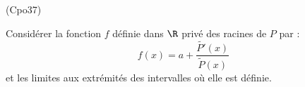 \begin{tiny}(Cpo37)\end{tiny} Considérer la fonction $f$ définie dans $\R$ privé des racines de $P$ par :
\begin{displaymath}
 f(x) = a + \frac{\widetilde{P'}(x)}{\widetilde{P}(x)}
\end{displaymath}
et les limites aux extrémités des intervalles où elle est définie. 